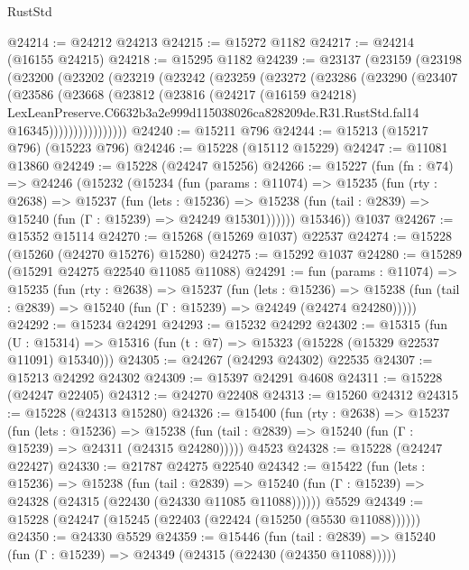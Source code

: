 \begin{lexlean}{RustStd}
\begin{coremodule}
@24214 := @24212 @24213
@24215 := @15272 @1182
@24217 := @24214 (@16155 @24215)
@24218 := @15295 @1182
@24239 := @23137
    (@23159
      (@23198
        (@23200
          (@23202
            (@23219
              (@23242
                (@23259
                  (@23272
                    (@23286
                      (@23290
                        (@23407
                          (@23586
                            (@23668
                              (@23812
                                (@23816
                                  (@24217
                                    (@16159 @24218)
                                    LexLeanPreserve.C6632b3a2e999d115038026ca828209de.R31.RustStd.fal14
                                    @16345))))))))))))))))
@24240 := @15211 @796
@24244 := @15213 (@15217 @796) (@15223 @796)
@24246 := @15228 (@15112 @15229)
@24247 := @11081 @13860
@24249 := @15228 (@24247 @15256)
@24266 := @15227
    (fun (fn : @74) =>
    @24246
      (@15232
        (@15234
          (fun (params : @11074) =>
          @15235
            (fun (rty : @2638) =>
            @15237
              (fun (lets : @15236) =>
              @15238 (fun (tail : @2839) => @15240 (fun (Γ : @15239) => @24249 @15301))))))
        @15346))
    @1037
@24267 := @15352 @15114
@24270 := @15268 (@15269 @1037) @22537
@24274 := @15228 (@15260 (@24270 @15276) @15280)
@24275 := @15292 @1037
@24280 := @15289 (@15291 @24275 @22540 @11085 @11088)
@24291 := fun (params : @11074) =>
  @15235
    (fun (rty : @2638) =>
    @15237
      (fun (lets : @15236) =>
      @15238 (fun (tail : @2839) => @15240 (fun (Γ : @15239) => @24249 (@24274 @24280)))))
@24292 := @15234 @24291
@24293 := @15232 @24292
@24302 := @15315
    (fun (U : @15314) => @15316 (fun (t : @7) => @15323 (@15228 (@15329 @22537 @11091) @15340)))
@24305 := @24267 (@24293 @24302) @22535
@24307 := @15213 @24292 @24302
@24309 := @15397 @24291 @4608
@24311 := @15228 (@24247 @22405)
@24312 := @24270 @22408
@24313 := @15260 @24312
@24315 := @15228 (@24313 @15280)
@24326 := @15400
    (fun (rty : @2638) =>
    @15237
      (fun (lets : @15236) =>
      @15238 (fun (tail : @2839) => @15240 (fun (Γ : @15239) => @24311 (@24315 @24280)))))
    @4523
@24328 := @15228 (@24247 @22427)
@24330 := @21787 @24275 @22540
@24342 := @15422
    (fun (lets : @15236) =>
    @15238
      (fun (tail : @2839) =>
      @15240 (fun (Γ : @15239) => @24328 (@24315 (@22430 (@24330 @11085 @11088))))))
    @5529
@24349 := @15228 (@24247 (@15245 (@22403 (@22424 (@15250 (@5530 @11088))))))
@24350 := @24330 @5529
@24359 := @15446
    (fun (tail : @2839) => @15240 (fun (Γ : @15239) => @24349 (@24315 (@22430 (@24350 @11088)))))

\end{coremodule}
\end{lexlean}
